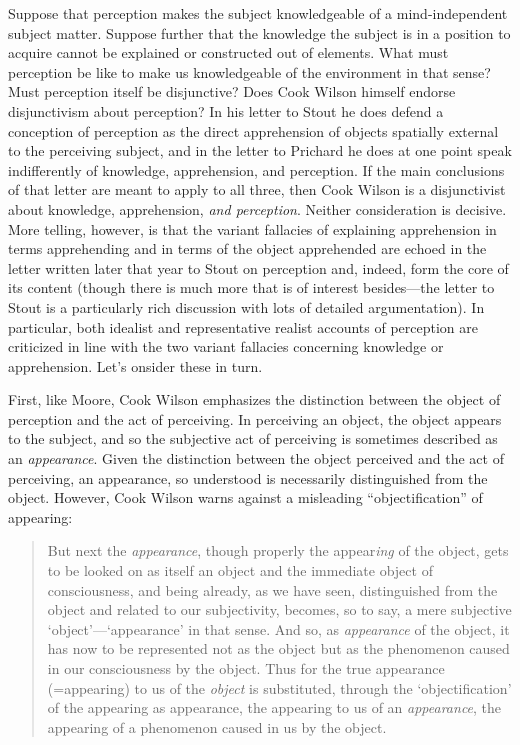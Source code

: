 Suppose that perception makes the subject knowledgeable of a mind-independent subject matter. Suppose further that the knowledge the subject is in a position to acquire cannot be explained or constructed out of elements. What must perception be like to make us knowledgeable of the environment in that sense? Must perception itself be disjunctive? Does Cook Wilson himself endorse disjunctivism about perception? In his letter to Stout he does defend a conception of perception as the direct apprehension of objects spatially external to the perceiving subject, and in the letter to Prichard he does at one point speak indifferently of knowledge, apprehension, and perception. If the main conclusions of that letter are meant to apply to all three, then Cook Wilson is a disjunctivist about knowledge, apprehension, \emph{and perception}. Neither consideration is decisive. More telling, however, is that the variant fallacies of explaining apprehension in terms apprehending and in terms of the object apprehended are echoed in the letter written later that year to Stout on perception and, indeed, form the core of its content (though there is much more that is of interest besides---the letter to Stout is a particularly rich discussion with lots of detailed argumentation). In particular, both idealist and representative realist accounts of perception are criticized in line with the two variant fallacies concerning knowledge or apprehension. Let's onsider these in turn.

First, like Moore, Cook Wilson emphasizes the distinction between the object of perception and the act of perceiving. In perceiving an object, the object appears to the subject, and so the subjective act of perceiving is sometimes described as an \emph{appearance}. Given the distinction between the object perceived and the act of perceiving, an appearance, so understood is necessarily distinguished from the object. However, Cook Wilson warns against a misleading ``objectification'' of appearing:
\begin{quote}
	But next the \emph{appearance}, though properly the appear\emph{ing} of the object, gets to be looked on as itself an object and the immediate object of consciousness, and being already, as we have seen, distinguished from the object and related to our subjectivity, becomes, so to say, a mere subjective `object'---`appearance' in that sense. And so, as \emph{appearance} of the object, it has now to be represented not as the object but as the phenomenon caused in our consciousness by the object. Thus for the true appearance (=appearing) to us of the \emph{object} is substituted, through the `objectification' of the appearing as appearance, the appearing to us of an \emph{appearance}, the appearing of a phenomenon caused in us by the object.  \citep[796]{Cook-Wilson:1926sf}
\end{quote}

